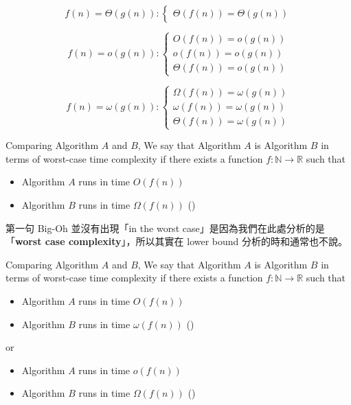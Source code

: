 \[
f(n) = \Theta(g(n)) : 
\begin{cases}
\Theta(f(n)) = \Theta(g(n))
\end{cases}
\]

\[
f(n) = o(g(n)) : 
\begin{cases}
O(f(n)) = o(g(n)) \\
o(f(n)) = o(g(n)) \\
\Theta(f(n)) = o(g(n))
\end{cases}
\]

\[
f(n) = \omega(g(n)) : 
\begin{cases}
\Omega(f(n)) = \omega(g(n)) \\
\omega(f(n)) = \omega(g(n)) \\
\Theta(f(n)) = \omega(g(n))
\end{cases}
\]

Comparing Algorithm $A$ and $B$, We say that Algorithm $A$ is  Algorithm $B$ in terms of worst-case time complexity if there exists a function $f : \mathbb{N} \rightarrow \mathbb{R}$ such that
\begin{itemize}
    \item Algorithm $A$ runs in time $O(f(n))$
    \item Algorithm $B$ runs in time $\Omega(f(n))$ ()
\end{itemize}

\begin{remark}
    第一句 Big-Oh 並沒有出現「in the worst case」是因為我們在此處分析的是「\textbf{worst case complexity}」，所以其實在 lower bound 分析的時和通常也不說。
\end{remark}

\vspace{0.7em}

Comparing Algorithm $A$ and $B$, We say that Algorithm $A$ is  Algorithm $B$ in terms of worst-case time complexity if there exists a function $f : \mathbb{N} \rightarrow \mathbb{R}$ such that
\begin{itemize}
    \item Algorithm $A$ runs in time $O(f(n))$
    \item Algorithm $B$ runs in time $\omega(f(n))$ ()
\end{itemize}
or
\begin{itemize}
    \item Algorithm $A$ runs in time $o(f(n))$
    \item Algorithm $B$ runs in time $\Omega(f(n))$ ()
\end{itemize}

